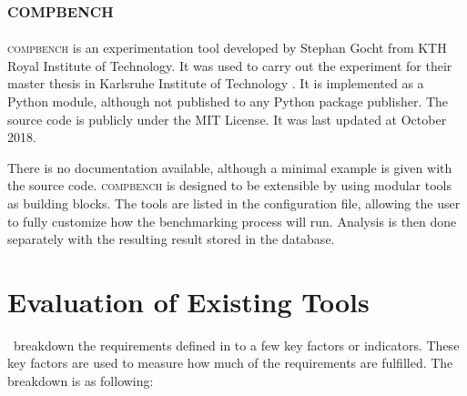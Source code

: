 \subsection{\textsc{compbench}}

\textsc{compbench} \citep{gochtPythonFrameworkRunning2018} is an experimentation tool developed by Stephan Gocht from KTH Royal Institute of Technology.
It was used to carry out the experiment for their master thesis in Karlsruhe Institute of Technology \citep{gochtIncrementalSATSolving}.
It is implemented as a Python module, although not published to any Python package publisher.
The source code is publicly under the MIT License.
It was last updated at October 2018.

There is no documentation available, although a minimal example is given with the source code.
\textsc{compbench} is designed to be extensible by using modular tools as building blocks.
The tools are listed in the configuration file, allowing the user to fully customize how the benchmarking process will run.
Analysis is then done separately with the resulting result stored in the database.


\section{Evaluation of Existing Tools}

\First~breakdown the requirements defined in  to a few key factors or indicators.
These key factors are used to measure how much of the requirements are fulfilled.
The breakdown is as following:

